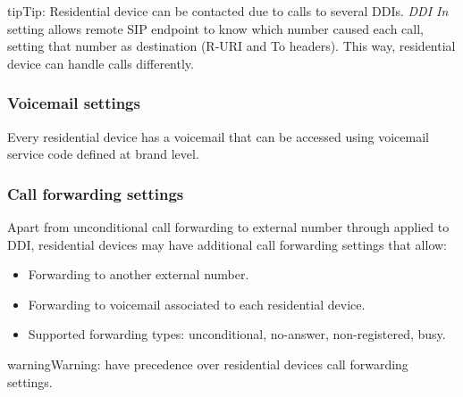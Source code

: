 \documentclass[letterpaper,10pt,english]{sphinxmanual}
\begin{document}
\begin{notice}{tip}{Tip:}
Residential device can be contacted due to calls to several DDIs. \emph{DDI In} setting allows remote SIP endpoint to
know which number caused each call, setting that number as destination (R-URI and To headers). This way, residential
device can handle calls differently.
\end{notice}


\subsubsection{Voicemail settings}
\label{administration_portal/client/residential/residential_devices:voicemail-settings}
Every residential device has a voicemail that can be accessed using voicemail service code defined at brand level.


\subsubsection{Call forwarding settings}
\label{administration_portal/client/residential/residential_devices:residential-devices-cfw}\label{administration_portal/client/residential/residential_devices:call-forwarding-settings}
Apart from unconditional call forwarding to external number through {\hyperref[administration_portal/client/vpbx/routing_tools/external_call_filters:external\string-call\string-filters]{}} applied to DDI,
residential devices may have additional call forwarding settings that allow:
\begin{itemize}
\item {} 
Forwarding to another external number.

\item {} 
Forwarding to voicemail associated to each residential device.

\item {} 
Supported forwarding types: unconditional, no-answer, non-registered, busy.

\end{itemize}

\begin{notice}{warning}{Warning:}
{\hyperref[administration_portal/client/vpbx/routing_tools/external_call_filters:external\string-call\string-filters]{}} have precedence over residential devices call forwarding settings.
\end{notice}
\end{document}
